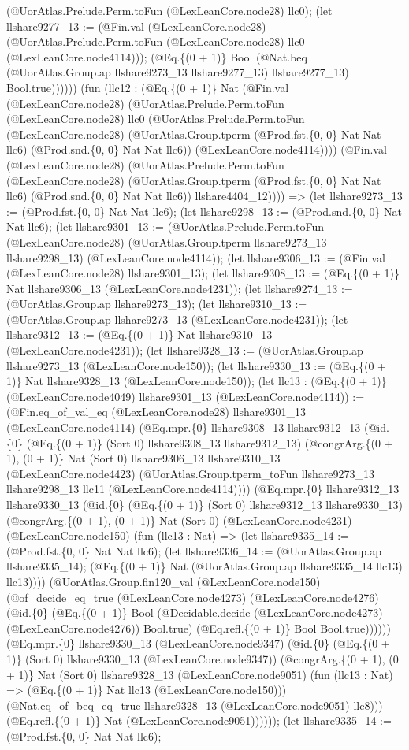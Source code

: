 \documentclass[11pt]{article}
\begin{document}
(@UorAtlas.Prelude.Perm.toFun (@LexLeanCore.node28) llc0); (let llshare9277\_13 := (@Fin.val (@LexLeanCore.node28) (@UorAtlas.Prelude.Perm.toFun (@LexLeanCore.node28) llc0 (@LexLeanCore.node4114))); (@Eq.\{(0 + 1)\} Bool (@Nat.beq (@UorAtlas.Group.ap llshare9273\_13 llshare9277\_13) llshare9277\_13) Bool.true)))))) (fun (llc12 : (@Eq.\{(0 + 1)\} Nat (@Fin.val (@LexLeanCore.node28) (@UorAtlas.Prelude.Perm.toFun (@LexLeanCore.node28) llc0 (@UorAtlas.Prelude.Perm.toFun (@LexLeanCore.node28) (@UorAtlas.Group.tperm (@Prod.fst.\{0, 0\} Nat Nat llc6) (@Prod.snd.\{0, 0\} Nat Nat llc6)) (@LexLeanCore.node4114)))) (@Fin.val (@LexLeanCore.node28) (@UorAtlas.Prelude.Perm.toFun (@LexLeanCore.node28) (@UorAtlas.Group.tperm (@Prod.fst.\{0, 0\} Nat Nat llc6) (@Prod.snd.\{0, 0\} Nat Nat llc6)) llshare4404\_12)))) => (let llshare9273\_13 := (@Prod.fst.\{0, 0\} Nat Nat llc6); (let llshare9298\_13 := (@Prod.snd.\{0, 0\} Nat Nat llc6); (let llshare9301\_13 := (@UorAtlas.Prelude.Perm.toFun (@LexLeanCore.node28) (@UorAtlas.Group.tperm llshare9273\_13 llshare9298\_13) (@LexLeanCore.node4114)); (let llshare9306\_13 := (@Fin.val (@LexLeanCore.node28) llshare9301\_13); (let llshare9308\_13 := (@Eq.\{(0 + 1)\} Nat llshare9306\_13 (@LexLeanCore.node4231)); (let llshare9274\_13 := (@UorAtlas.Group.ap llshare9273\_13); (let llshare9310\_13 := (@UorAtlas.Group.ap llshare9273\_13 (@LexLeanCore.node4231)); (let llshare9312\_13 := (@Eq.\{(0 + 1)\} Nat llshare9310\_13 (@LexLeanCore.node4231)); (let llshare9328\_13 := (@UorAtlas.Group.ap llshare9273\_13 (@LexLeanCore.node150)); (let llshare9330\_13 := (@Eq.\{(0 + 1)\} Nat llshare9328\_13 (@LexLeanCore.node150)); (let llc13 : (@Eq.\{(0 + 1)\} (@LexLeanCore.node4049) llshare9301\_13 (@LexLeanCore.node4114)) := (@Fin.eq\_of\_val\_eq (@LexLeanCore.node28) llshare9301\_13 (@LexLeanCore.node4114) (@Eq.mpr.\{0\} llshare9308\_13 llshare9312\_13 (@id.\{0\} (@Eq.\{(0 + 1)\} (Sort 0) llshare9308\_13 llshare9312\_13) (@congrArg.\{(0 + 1), (0 + 1)\} Nat (Sort 0) llshare9306\_13 llshare9310\_13 (@LexLeanCore.node4423) (@UorAtlas.Group.tperm\_toFun llshare9273\_13 llshare9298\_13 llc11 (@LexLeanCore.node4114)))) (@Eq.mpr.\{0\} llshare9312\_13 llshare9330\_13 (@id.\{0\} (@Eq.\{(0 + 1)\} (Sort 0) llshare9312\_13 llshare9330\_13) (@congrArg.\{(0 + 1), (0 + 1)\} Nat (Sort 0) (@LexLeanCore.node4231) (@LexLeanCore.node150) (fun (llc13 : Nat) => (let llshare9335\_14 := (@Prod.fst.\{0, 0\} Nat Nat llc6); (let llshare9336\_14 := (@UorAtlas.Group.ap llshare9335\_14); (@Eq.\{(0 + 1)\} Nat (@UorAtlas.Group.ap llshare9335\_14 llc13) llc13)))) (@UorAtlas.Group.fin120\_val (@LexLeanCore.node150) (@of\_decide\_eq\_true (@LexLeanCore.node4273) (@LexLeanCore.node4276) (@id.\{0\} (@Eq.\{(0 + 1)\} Bool (@Decidable.decide (@LexLeanCore.node4273) (@LexLeanCore.node4276)) Bool.true) (@Eq.refl.\{(0 + 1)\} Bool Bool.true)))))) (@Eq.mpr.\{0\} llshare9330\_13 (@LexLeanCore.node9347) (@id.\{0\} (@Eq.\{(0 + 1)\} (Sort 0) llshare9330\_13 (@LexLeanCore.node9347)) (@congrArg.\{(0 + 1), (0 + 1)\} Nat (Sort 0) llshare9328\_13 (@LexLeanCore.node9051) (fun (llc13 : Nat) => (@Eq.\{(0 + 1)\} Nat llc13 (@LexLeanCore.node150))) (@Nat.eq\_of\_beq\_eq\_true llshare9328\_13 (@LexLeanCore.node9051) llc8))) (@Eq.refl.\{(0 + 1)\} Nat (@LexLeanCore.node9051)))))); (let llshare9335\_14 := (@Prod.fst.\{0, 0\} Nat Nat llc6); 
\end{document}
